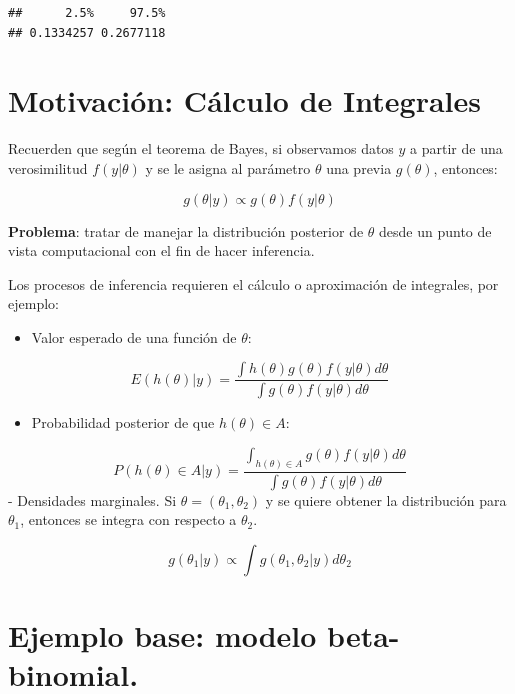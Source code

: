 \documentclass[
  12pt,
]{book}
\providecommand{\tightlist}{%
  \setlength{\itemsep}{0pt}\setlength{\parskip}{0pt}}
\theoremstyle{definition}
\theoremstyle{definition}
\theoremstyle{definition}
\theoremstyle{definition}
\theoremstyle{remark}
\begin{document}
\begin{verbatim}
##      2.5%     97.5% 
## 0.1334257 0.2677118
\end{verbatim}

\hypertarget{motivaciuxf3n-cuxe1lculo-de-integrales}{%
\section{Motivación: Cálculo de Integrales}\label{motivaciuxf3n-cuxe1lculo-de-integrales}}

Recuerden que según el teorema de Bayes, si observamos datos \(y\) a partir de una verosimilitud \(f(y|\theta)\) y se le asigna al parámetro \(\theta\) una previa \(g(\theta)\), entonces:

\[g(\theta|y)\propto g(\theta)f(y|\theta)\]

\textbf{Problema}: tratar de manejar la distribución posterior de \(\theta\) desde un punto de vista computacional con el fin de hacer inferencia.

Los procesos de inferencia requieren el cálculo o aproximación de integrales, por ejemplo:

\begin{itemize}
\tightlist
\item
  Valor esperado de una función de \(\theta\):
\end{itemize}

\[E(h(\theta)|y)=\frac{\int h(\theta)g(\theta)f(y|\theta) d\theta}{\int g(\theta)f(y|\theta) d\theta}\]

\begin{itemize}
\tightlist
\item
  Probabilidad posterior de que \(h(\theta) \in A\):
\end{itemize}

\[P(h(\theta) \in A|y)=\frac{\int_{h(\theta) \in A} g(\theta)f(y|\theta) d\theta}{\int g(\theta)f(y|\theta) d\theta}\]
- Densidades marginales. Si \(\theta=(\theta_1,\theta_2)\) y se quiere obtener la distribución para \(\theta_1\), entonces se integra con respecto a \(\theta_2\).

\[g(\theta_1|y)\propto \int g(\theta_1,\theta_2|y)d\theta_2\]

\hypertarget{ejemplo-base-modelo-beta-binomial.}{%
\section{Ejemplo base: modelo beta-binomial.}\label{ejemplo-base-modelo-beta-binomial.}}
\end{document}
